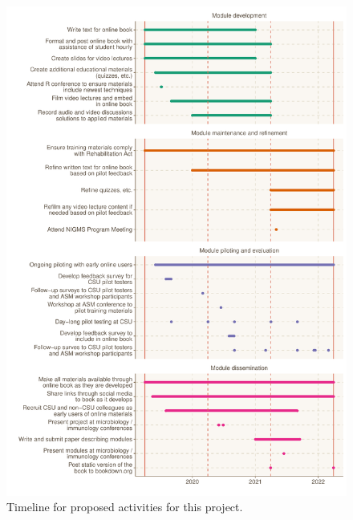 \documentclass[pdftex,english,11pt,parskip=half]{scrartcl}
\begin{document}
\begin{figure}[ht]
    \includegraphics[width=\textwidth]{figures/timeline.pdf}
    \caption{Timeline for proposed activities for this project.}
    \label{fig:timeline}
\end{figure}

\clearpage



\end{document}
